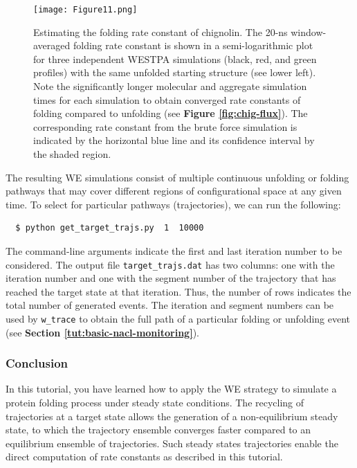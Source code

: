 \begin{figure}
\texttt{[image: Figure11.png]}
\caption{Estimating the folding rate constant of chignolin. 
The 20-ns window-averaged folding rate constant is shown in a semi-logarithmic plot for three independent WESTPA simulations (black, red, and green profiles) with the same unfolded starting structure (see lower left). 
Note the significantly longer molecular and aggregate simulation times for each simulation to obtain converged rate constants of folding compared to unfolding (see \textbf{Figure \ref{fig:chig-flux}}). 
The corresponding rate constant from the brute force simulation is indicated by the horizontal blue line and its confidence interval by the shaded region.}
\label{fig:chig-flux-3}
\end{figure}

The resulting WE simulations consist of multiple continuous unfolding or folding pathways that may cover different regions of configurational space at any given time. 
To select for particular pathways (trajectories), we can run the following: 
\begin{verbatim}
  $ python get_target_trajs.py  1  10000
\end{verbatim}
The command-line arguments indicate the first and last iteration number to be considered. 
The output file \verb|target_trajs.dat| has two columns: one with the iteration number and one with the segment number of the trajectory that has reached the target state at that iteration. 
Thus, the number of rows indicates the total number of generated events. 
The iteration and segment numbers can be used by \verb|w_trace| to obtain the full path of a particular folding or unfolding event (see \textbf{Section \ref{tut:basic-nacl-monitoring}}).

\subsubsection{Conclusion}

In this tutorial, you have learned how to apply the WE strategy to simulate a protein folding process under steady state conditions. 
The recycling of trajectories at a target state allows the generation of a non-equilibrium steady state, to which the trajectory ensemble converges faster compared to an equilibrium ensemble of trajectories. 
Such steady states trajectories enable  the direct computation of rate constants as described in this tutorial.
\vspace{-0.125cm}

